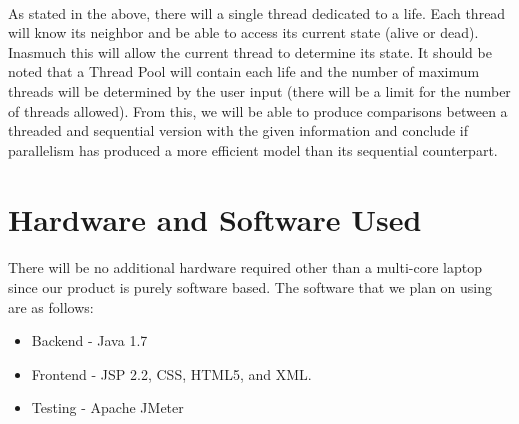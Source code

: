 \documentclass[12pt,a4paper]{report}
\begin{document}
\paragraph{}
As stated in the above, there will a single thread dedicated to a life. Each thread will know its neighbor and be able to access its current state (alive or dead). Inasmuch this will allow the current thread to determine its state. It should be noted that a Thread Pool will contain each life and the number of maximum threads will be determined by the user input (there will be a limit for the number of threads allowed). From this, we will be able to produce comparisons between a threaded and sequential version with the given information and conclude if parallelism has produced a more efficient model than its sequential counterpart. 
\section{Hardware and Software Used}
\paragraph{}
There will be no additional hardware required other than a multi-core laptop since our product is purely software based.
The software that we plan on using are as follows: 
\begin{itemize}
\item Backend - Java 1.7
\item Frontend - JSP 2.2, CSS, HTML5, and XML.
\item Testing - Apache JMeter
\end{itemize}
\end{document}
